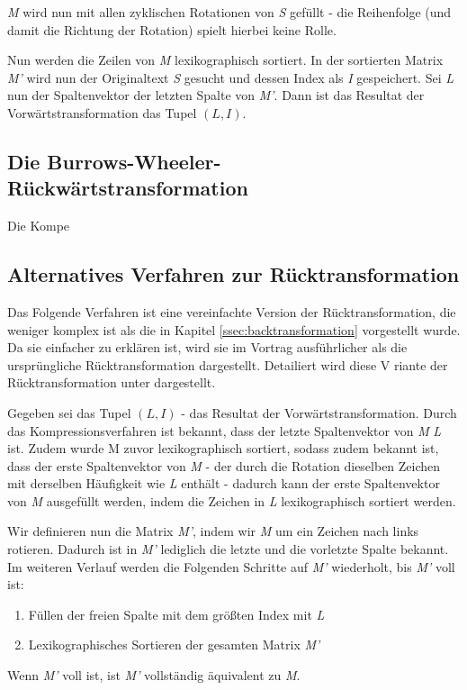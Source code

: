 \documentclass[ngerman,pdftex,paper=A4,DIV=calc,titlepage,12pt]{scrartcl}
\newtheorem[L]{boxedDefinition}{Definition}
\begin{document}
\textit{M} wird nun mit allen zyklischen Rotationen von \textit{S} gefüllt - die Reihenfolge (und damit die Richtung der Rotation) spielt hierbei keine Rolle.

Nun werden die Zeilen von \textit{M} lexikographisch sortiert. In der sortierten Matrix \textit{M'} wird nun der Originaltext \textit{S} gesucht und dessen Index als \textit{I} gespeichert. Sei \textit{L} nun der Spaltenvektor der letzten Spalte von \textit{M'}. Dann ist das Resultat der Vorwärtstransformation das Tupel $(L, I)$.
\subsection{Die Burrows-Wheeler-Rückwärtstransformation}
\label{ssec:backtransformation}
Die Kompe
\subsection{Alternatives Verfahren zur Rücktransformation}
Das Folgende Verfahren ist eine vereinfachte Version der Rücktransformation, die weniger komplex ist als die in Kapitel \vref{ssec:backtransformation} vorgestellt wurde. Da sie einfacher zu erklären ist, wird sie im Vortrag ausführlicher als die ursprüngliche Rücktransformation dargestellt. Detailiert wird diese V riante der Rücktransformation unter \cite{Wik2012-1} dargestellt.

Gegeben sei das Tupel $(L,I)$ - das Resultat der Vorwärtstransformation.
Durch das Kompressionsverfahren ist bekannt, dass der letzte Spaltenvektor von \textit{M} \textit{L} ist. Zudem wurde M zuvor lexikographisch sortiert, sodass zudem bekannt ist, dass der erste Spaltenvektor von \textit{M} - der durch die Rotation dieselben Zeichen mit derselben Häufigkeit wie \textit{L} enthält - dadurch kann der erste Spaltenvektor von \textit{M} ausgefüllt werden, indem die Zeichen in \textit{L} lexikographisch sortiert werden.

Wir definieren nun die Matrix \textit{M'}, indem wir \textit{M} um ein Zeichen nach links rotieren. Dadurch ist in \textit{M'} lediglich die letzte und die vorletzte Spalte bekannt.\\\newline
\noindent Im weiteren Verlauf werden die Folgenden Schritte auf \textit{M'} wiederholt, bis \textit{M'} voll ist:
\begin{enumerate}
 \item Füllen der freien Spalte mit dem größten Index mit \textit{L}
 \item Lexikographisches Sortieren der gesamten Matrix \textit{M'}
\end{enumerate}
Wenn \textit{M'} voll ist, ist \textit{M'} vollständig äquivalent zu \textit{M}.
\end{document}
